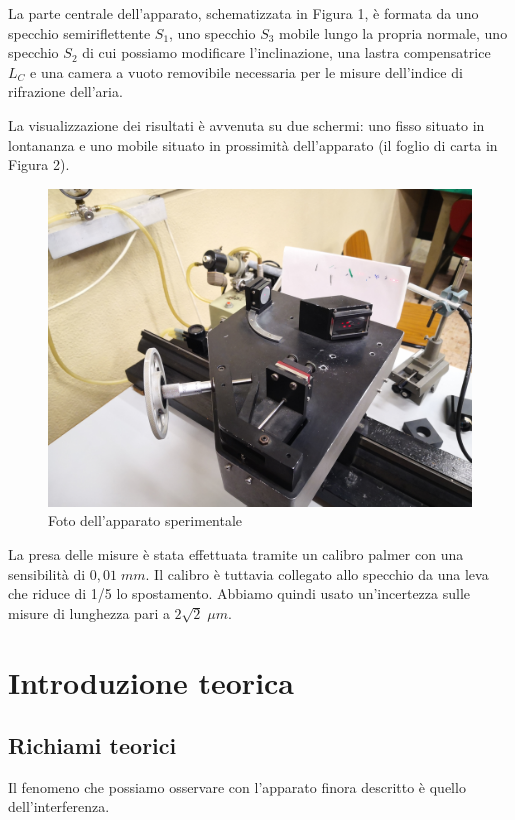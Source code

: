 \documentclass{article}
\begin{document}
\vspace{3mm}

La parte centrale dell'apparato, schematizzata in Figura 1, è formata da uno specchio semiriflettente $S_1$, uno specchio $S_3$ mobile lungo la propria normale, uno specchio $S_2$ di cui possiamo modificare l'inclinazione, una lastra compensatrice $L_C$ e una camera a vuoto removibile necessaria per le misure dell'indice di rifrazione dell'aria. 

\vspace{3mm}

La visualizzazione dei risultati è avvenuta su due schermi: uno fisso situato in lontananza e uno mobile situato in prossimità dell'apparato (il foglio di carta in Figura 2).

\vspace{2mm}

\begin{figure}[h!]
  \centering
  \includegraphics[width=0.5\linewidth]{IM strumentazione}
  \caption{Foto dell'apparato sperimentale}
\end{figure}



La presa delle misure è stata effettuata tramite un calibro palmer con una sensibilità di $0,01 \; mm$. Il calibro è tuttavia collegato allo specchio da una leva che riduce di 1/5 lo spostamento. Abbiamo quindi usato un'incertezza sulle misure di lunghezza pari a $2 \sqrt2 \; \mu m$.




\section{Introduzione teorica}
\subsection{Richiami teorici}
Il fenomeno che possiamo osservare con l'apparato finora descritto è quello dell'interferenza.
\end{document}
